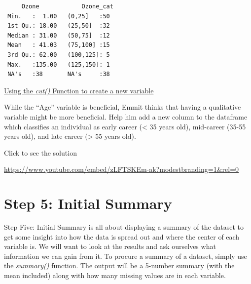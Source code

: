 \documentclass[
  letterpaper,
  DIV=11,
  numbers=noendperiod]{scrreprt}
\begin{document}
\begin{verbatim}
     Ozone            Ozone_cat 
 Min.   :  1.00   (0,25]   :50  
 1st Qu.: 18.00   (25,50]  :32  
 Median : 31.00   (50,75]  :12  
 Mean   : 41.03   (75,100] :15  
 3rd Qu.: 62.00   (100,125]: 5  
 Max.   :135.00   (125,150]: 1  
 NA's   :38       NA's     :38  
\end{verbatim}

\begin{watch}{}{}
    \href{https://youtu.be/3qMzvNiGmd4}{Using the \textit{cut()} Function to create a new variable}
\end{watch}

\begin{tcolorbox}[enhanced jigsaw, leftrule=.75mm, arc=.35mm, coltitle=black, rightrule=.15mm, bottomrule=.15mm, toprule=.15mm, left=2mm, colbacktitle=quarto-callout-tip-color!10!white, title=\textcolor{quarto-callout-tip-color}{\faLightbulb}\hspace{0.5em}{Try it Out}, toptitle=1mm, breakable, colframe=quarto-callout-tip-color-frame, bottomtitle=1mm, titlerule=0mm, colback=white, opacityback=0, opacitybacktitle=0.6]

While the ``Age'' variable is beneficial, Emmit thinks that having a
qualitative variable might be more beneficial. Help him add a new column
to the dataframe which classifies an individual as early career
(\textless{} 35 years old), mid-career (35-55 years old), and late
career (\textgreater{} 55 years old).

Click to see the solution

\url{https://www.youtube.com/embed/zLFTSKEm-ak?modestbranding=1&rel=0}

\end{tcolorbox}

\section{Step 5: Initial Summary}\label{step-5-initial-summary}

Step Five: Initial Summary is all about displaying a summary of the
dataset to get some insight into how the data is spread out and where
the center of each variable is. We will want to look at the results and
ask ourselves what information we can gain from it. To procure a summary
of a dataset, simply use the \emph{summary()} function. The output will
be a 5-number summary (with the mean included) along with how many
missing values are in each variable.
\end{document}
